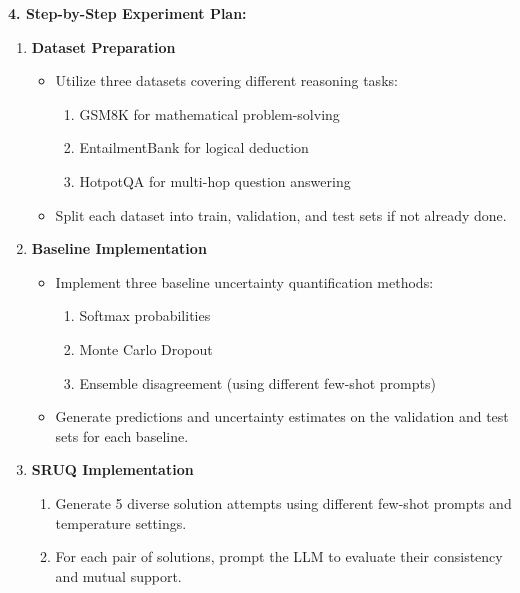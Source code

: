 \newpage 



\begin{tcolorbox}[colback=blue!5!white,colframe=blue!75!black,title=\textbf{Semantic Resonance Uncertainty Quantification (SRUQ) (Part 2)}]
\small 
    \textbf{4. Step-by-Step Experiment Plan:}
    \begin{enumerate}
        \item \textbf{Dataset Preparation}
        \begin{itemize}
            \item Utilize three datasets covering different reasoning tasks:
            \begin{enumerate}
                \item GSM8K for mathematical problem-solving
                \item EntailmentBank for logical deduction
                \item HotpotQA for multi-hop question answering
            \end{enumerate}
            \item Split each dataset into train, validation, and test sets if not already done.
        \end{itemize}
        \item \textbf{Baseline Implementation}
        \begin{itemize}
            \item Implement three baseline uncertainty quantification methods:
            \begin{enumerate}
                \item Softmax probabilities
                \item Monte Carlo Dropout
                \item Ensemble disagreement (using different few-shot prompts)
            \end{enumerate}
            \item Generate predictions and uncertainty estimates on the validation and test sets for each baseline.
        \end{itemize}
        \item \textbf{SRUQ Implementation}
        \begin{enumerate}
            \item Generate 5 diverse solution attempts using different few-shot prompts and temperature settings.
            \item For each pair of solutions, prompt the LLM to evaluate their consistency and mutual support.

\end{enumerate}
\end{enumerate}
\end{tcolorbox}
